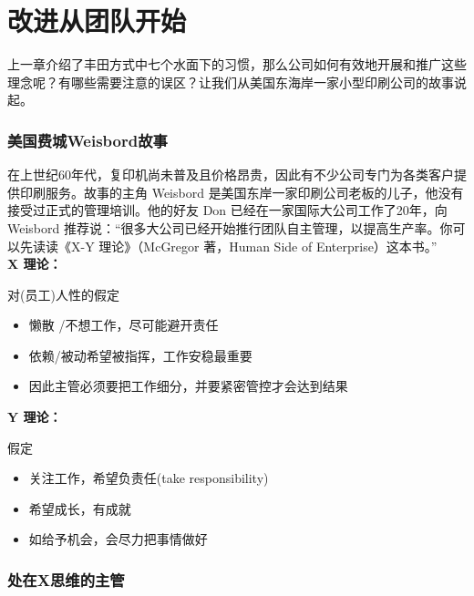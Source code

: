 \chapter{改进从团队开始} %

上一章介绍了丰田方式中七个水面下的习惯，那么公司如何有效地开展和推广这些理念呢？有哪些需要注意的误区？让我们从美国东海岸一家小型印刷公司的故事说起。

\hypertarget{ux7f8eux56fdux8d39ux57ceweisbordux6545ux4e8b}{%
\subsection{美国费城Weisbord故事}\label{ux7f8eux56fdux8d39ux57ceweisbordux6545ux4e8b}}

在上世纪60年代，复印机尚未普及且价格昂贵，因此有不少公司专门为各类客户提供印刷服务。故事的主角 Weisbord 是美国东岸一家印刷公司老板的儿子，他没有接受过正式的管理培训。他的好友 Don 已经在一家国际大公司工作了20年，向 Weisbord 推荐说：“很多大公司已经开始推行团队自主管理，以提高生产率。你可以先读读《X-Y 理论》（McGregor 著，Human Side of Enterprise）这本书。”\\

\textbf{X 理论：}

对(员工)人性的假定

\begin{itemize}
\tightlist
\item
  懒散 /不想工作，尽可能避开责任
\item
  依赖/被动希望被指挥，工作安稳最重要
\item
  因此主管必须要把工作细分，并要紧密管控才会达到结果
\end{itemize}

\textbf{Y 理论：}

假定

\begin{itemize}
\tightlist
\item
  关注工作，希望负责任(take responsibility)
\item
  希望成长，有成就
\item
  如给予机会，会尽力把事情做好
\end{itemize}

\hypertarget{ux95eeux9898ux5904ux4e8exux601dux7ef4ux7684ux4e3bux7ba1}{%
\subsection{处在X思维的主管}\label{ux95eeux9898ux5904ux4e8exux601dux7ef4ux7684ux4e3bux7ba1}}

